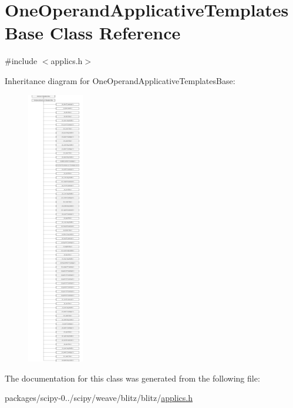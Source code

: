 \hypertarget{classOneOperandApplicativeTemplatesBase}{}\section{One\+Operand\+Applicative\+Templates\+Base Class Reference}
\label{classOneOperandApplicativeTemplatesBase}


{\ttfamily \#include $<$applics.\+h$>$}

Inheritance diagram for One\+Operand\+Applicative\+Templates\+Base\+:\begin{figure}[H]
\begin{center}
\leavevmode
\includegraphics[height=12.000000cm]{classOneOperandApplicativeTemplatesBase}
\end{center}
\end{figure}


The documentation for this class was generated from the following file\+:\begin{DoxyCompactItemize}
\item 
packages/scipy-\/0../scipy/weave/blitz/blitz/\hyperlink{applics_8h}{applics.\+h}\end{DoxyCompactItemize}
